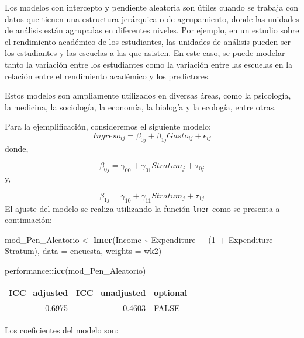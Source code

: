 \documentclass[
  spanish,
  12pt,
]{book}
\newenvironment{Shaded}{\begin{snugshade}}{\end{snugshade}}
\newcommand{\AttributeTok}[1]{\textcolor[rgb]{0.13,0.29,0.53}{#1}}
\newcommand{\DataTypeTok}[1]{\textcolor[rgb]{0.13,0.29,0.53}{#1}}
\newcommand{\DecValTok}[1]{\textcolor[rgb]{0.00,0.00,0.81}{#1}}
\newcommand{\FunctionTok}[1]{\textcolor[rgb]{0.13,0.29,0.53}{\textbf{#1}}}
\newcommand{\NormalTok}[1]{#1}
\newcommand{\OtherTok}[1]{\textcolor[rgb]{0.56,0.35,0.01}{#1}}
\newcommand{\SpecialCharTok}[1]{\textcolor[rgb]{0.81,0.36,0.00}{\textbf{#1}}}
\begin{document}
Los modelos con intercepto y pendiente aleatoria son útiles cuando se trabaja con datos que tienen una estructura jerárquica o de agrupamiento, donde las unidades de análisis están agrupadas en diferentes niveles. Por ejemplo, en un estudio sobre el rendimiento académico de los estudiantes, las unidades de análisis pueden ser los estudiantes y las escuelas a las que asisten. En este caso, se puede modelar tanto la variación entre los estudiantes como la variación entre las escuelas en la relación entre el rendimiento académico y los predictores.

Estos modelos son ampliamente utilizados en diversas áreas, como la psicología, la medicina, la sociología, la economía, la biología y la ecología, entre otras.

Para la ejemplificación, consideremos el siguiente modelo:
\[
Ingreso_{ij}=\beta_{0j}+\beta_{1j}Gasto_{ij}+\epsilon_{ij}
\]
donde,

\[
\beta_{0j} = \gamma_{00}+\gamma_{01}Stratum_{j} + \tau_{0j}
\]
y,

\[
\beta_{1j} = \gamma_{10}+\gamma_{11}Stratum_{j} + \tau_{1j}
\]
El ajuste del modelo se realiza utilizando la función \texttt{lmer} como se presenta a continuación:

\begin{Shaded}
\begin{Highlighting}[]
\NormalTok{mod\_Pen\_Aleatorio }\OtherTok{\textless{}{-}} \FunctionTok{lmer}\NormalTok{(Income }\SpecialCharTok{\textasciitilde{}}\NormalTok{ Expenditure  }\SpecialCharTok{+}\NormalTok{ (}\DecValTok{1} \SpecialCharTok{+}\NormalTok{ Expenditure}\SpecialCharTok{|}\NormalTok{ Stratum),}
  \AttributeTok{data =}\NormalTok{ encuesta, }\AttributeTok{weights  =}\NormalTok{  wk2)}

\NormalTok{performance}\SpecialCharTok{::}\FunctionTok{icc}\NormalTok{(mod\_Pen\_Aleatorio)}
\end{Highlighting}
\end{Shaded}

\begin{tabular}{r|r|l}
\hline
ICC\_adjusted & ICC\_unadjusted & optional\\
\hline
0.6975 & 0.4603 & FALSE\\
\hline
\end{tabular}

Los coeficientes del modelo son:

\begin{Shaded}
\end{Shaded}
\end{document}
